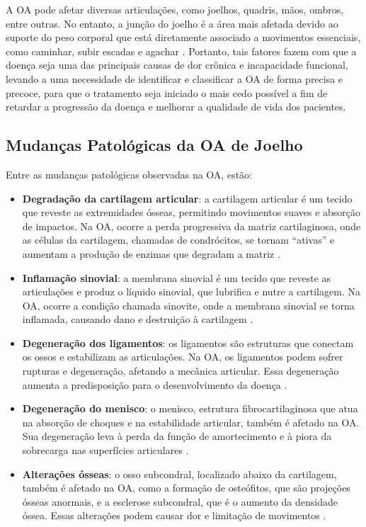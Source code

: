 A OA pode afetar diversas articulações, como joelhos, quadris, mãos, ombros, entre outras. No entanto, a junção do joelho é a área mais afetada devido ao suporte do peso corporal que está diretamente associado a movimentos essenciais, como caminhar, subir escadas e agachar \cite{Kanamoto2020}. Portanto, tais fatores fazem com que a doença seja uma das principais causas de dor crônica e incapacidade funcional, levando a uma necessidade de identificar e classificar a OA de forma precisa e precoce, para que o tratamento seja iniciado o mais cedo possível a fim de retardar a progressão da doença e melhorar a qualidade de vida dos pacientes.

\subsection{Mudanças Patológicas da OA de Joelho}

Entre as mudanças patológicas observadas na OA, estão:

\begin{itemize}
    \item \textbf{Degradação da cartilagem articular}: a cartilagem articular é um tecido que reveste as extremidades ósseas, permitindo movimentos suaves e absorção de impactos. Na OA, ocorre a perda progressiva da matriz cartilaginosa, onde as células da cartilagem, chamadas de condrócitos, se tornam ``ativas'' e aumentam a produção de enzimas que degradam a matriz \cite{Goldring2009}.
    \item \textbf{Inflamação sinovial}: a membrana sinovial é um tecido que reveste as articulações e produz o líquido sinovial, que lubrifica e nutre a cartilagem. Na OA, ocorre a condição chamada sinovite, onde a membrana sinovial se torna inflamada, causando dano e destruição à cartilagem \cite{Pessler2008}.
    \item \textbf{Degeneração dos ligamentos}: os ligamentos são estruturas que conectam os ossos e estabilizam as articulações. Na OA, os ligamentos podem sofrer rupturas e degeneração, afetando a mecânica articular. Essa degeneração aumenta a predisposição para o desenvolvimento da doença \cite{Loeser2012}.
    \item \textbf{Degeneração do menisco}: o menisco, estrutura fibrocartilaginosa que atua na absorção de choques e na estabilidade articular, também é afetado na OA. Sua degeneração leva à perda da função de amortecimento e à piora da sobrecarga nas superfícies articulares \cite{Loeser2012}.
    \item \textbf{Alterações ósseas}: o osso subcondral, localizado abaixo da cartilagem, também é afetado na OA, como a formação de osteófitos, que são projeções ósseas anormais, e a esclerose subcondral, que é o aumento da densidade óssea. Essas alterações podem causar dor e limitação de movimentos \cite{vanderKraan2007}.
\end{itemize}

